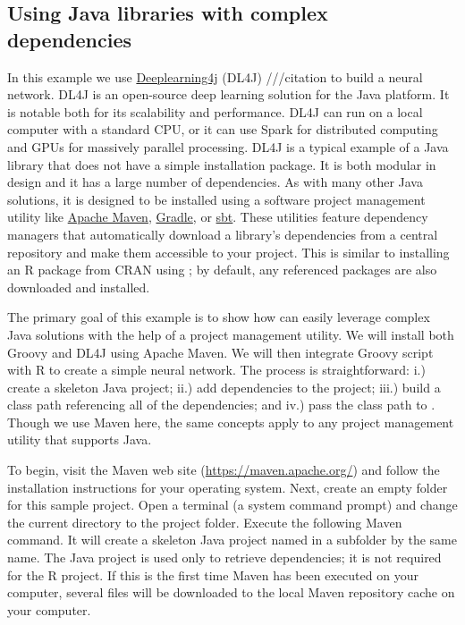 \hypertarget{using-java-libraries-with-complex-dependencies}{}
\subsection{Using Java libraries with complex dependencies}

In this example we use \href{https://deeplearning4j.org/}{Deeplearning4j} (DL4J) ///citation to build a neural network. DL4J is an open-source deep learning solution for the Java platform. It is notable both for its scalability and performance. DL4J can run on a local computer with a standard CPU, or it can use Spark for distributed computing and GPUs for massively parallel processing. DL4J is a typical example of a Java library that does not have a simple installation package. It is both modular in design and it has a large number of dependencies. As with many other Java solutions, it is designed to be installed using a software project management utility like \href{https://maven.apache.org/}{Apache Maven}, \href{https://gradle.org/}{Gradle}, or \href{https://www.scala-sbt.org/}{sbt}. These utilities feature dependency managers that automatically download a library's dependencies from a central repository and make them accessible to your project. This is similar to installing an R package from CRAN using ; by default, any referenced packages are also downloaded and installed.

The primary goal of this example is to show how  can easily leverage complex Java solutions with the help of a project management utility. We will install both Groovy and DL4J using Apache Maven. We will then integrate Groovy script with R to create a simple neural network. The process is straightforward: i.) create a skeleton Java project; ii.) add dependencies to the project; iii.) build a class path referencing all of the dependencies; and iv.) pass the class path to . Though we use Maven here, the same concepts apply to any project management utility that supports Java.

To begin, visit the Maven web site (\url{https://maven.apache.org/}) and follow the installation instructions for your operating system. Next, create an empty folder for this sample project. Open a terminal (a system command prompt) and change the current directory to the project folder. Execute the following Maven command. It will create a skeleton Java project named  in a subfolder by the same name. The Java project is used only to retrieve dependencies; it is not required for the R project. If this is the first time Maven has been executed on your computer, several files will be downloaded to the local Maven repository cache on your computer.

